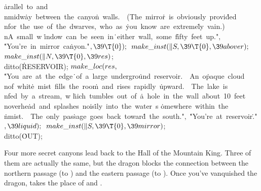 \.{arallel\ to\ and\\nmidw}\)\.{ay\ between\ the\ canyo}\)\.{n\ walls.\ \ (The\
mirro}\)\.{r\ is\ obviously\ provi}\)\.{ded\\nfor\ the\ use\ of\ }\)\.{the\
dwarves,\ who\ as\ }\)\.{you\ know\ are\ extreme}\)\.{ly\ vain.)\\nA\ small\ w}%
\)\.{indow\ can\ be\ seen\ in}\)\.{\ either\ wall,\ some\ f}\)\.{ifty\ feet\
up."}${},{}$\6
\.{"You're\ in\ mirror\ ca}\)\.{nyon."}${},\39\T{0});{}$\6
${}\\{make\_inst}(\|S,\39\T{0},\39\\{abover});{}$\6
${}\\{make\_inst}(\|N,\39\T{0},\39\\{res}){}$;\5
\\{ditto}(\.{RESERVOIR});\7
${}\\{make\_loc}(\\{res},{}$\6
\.{"You\ are\ at\ the\ edge}\)\.{\ of\ a\ large\ undergro}\)\.{und\ reservoir.\
\ An\ o}\)\.{paque\ cloud\\nof\ whit}\)\.{e\ mist\ fills\ the\ roo}\)\.{m\ and\
rises\ rapidly\ }\)\.{upward.\ \ The\ lake\ is}\)\.{\\nfed\ by\ a\ stream,\ w}%
\)\.{hich\ tumbles\ out\ of\ }\)\.{a\ hole\ in\ the\ wall\ a}\)\.{bout\ 10\
feet\\noverhe}\)\.{ad\ and\ splashes\ nois}\)\.{ily\ into\ the\ water\ s}\)%
\.{omewhere\ within\ the\\}\)\.{nmist.\ \ The\ only\ pas}\)\.{sage\ goes\ back\
towar}\)\.{d\ the\ south."}${},{}$\6
\.{"You're\ at\ reservoir}\)\.{."}${},\39\\{liquid});{}$\6
${}\\{make\_inst}(\|S,\39\T{0},\39\\{mirror}){}$;\5
\\{ditto}(\.{OUT});\par
\fi

\M{53}Four more secret canyons lead back to the Hall of the Mountain King.
Three of them are actually the same, but the dragon blocks the
connection between the northern passage (to \PB{\\{abover}}) and the
eastern passage (to \PB{\\{secret}}). Once you've vanquished the dragon,
\PB{\\{scan2}} takes the place of  and .

